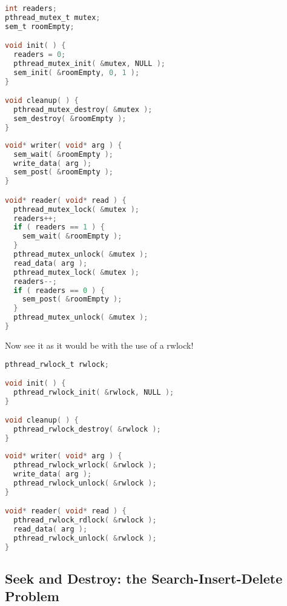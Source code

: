 \begin{multicols}{2}
\begin{lstlisting}[language=C]
int readers;
pthread_mutex_t mutex;
sem_t roomEmpty;

void init( ) {
  readers = 0;
  pthread_mutex_init( &mutex, NULL );
  sem_init( &roomEmpty, 0, 1 );
}

void cleanup( ) {
  pthread_mutex_destroy( &mutex );
  sem_destroy( &roomEmpty );
}
\end{lstlisting}

\columnbreak

\begin{lstlisting}[language=C]
void* writer( void* arg ) {
  sem_wait( &roomEmpty );
  write_data( arg );
  sem_post( &roomEmpty );
}

void* reader( void* read ) {
  pthread_mutex_lock( &mutex );
  readers++;
  if ( readers == 1 ) {
    sem_wait( &roomEmpty );
  }
  pthread_mutex_unlock( &mutex );
  read_data( arg );
  pthread_mutex_lock( &mutex );
  readers--;
  if ( readers == 0 ) {
    sem_post( &roomEmpty );
  }
  pthread_mutex_unlock( &mutex );
}
\end{lstlisting}

\end{multicols}

Now see it as it would be with the use of a rwlock!

\begin{multicols}{2}
\begin{lstlisting}[language=C]
pthread_rwlock_t rwlock;

void init( ) {
  pthread_rwlock_init( &rwlock, NULL );
}

void cleanup( ) {
  pthread_rwlock_destroy( &rwlock );
}
\end{lstlisting}

\columnbreak

\begin{lstlisting}[language=C]
void* writer( void* arg ) {
  pthread_rwlock_wrlock( &rwlock );
  write_data( arg );
  pthread_rwlock_unlock( &rwlock );
}

void* reader( void* read ) {
  pthread_rwlock_rdlock( &rwlock );
  read_data( arg );
  pthread_rwlock_unlock( &rwlock );
}
\end{lstlisting}

\end{multicols}

\subsection*{Seek and Destroy: the Search-Insert-Delete Problem}

